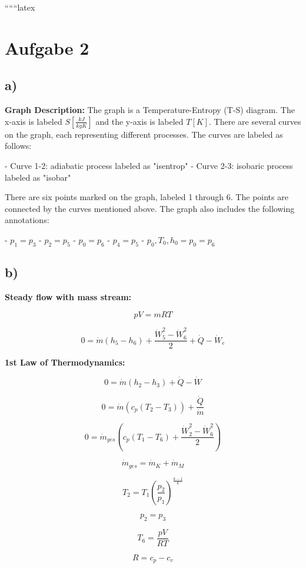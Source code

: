 
``````latex


\section*{Aufgabe 2}

\subsection*{a)}

\textbf{Graph Description:} The graph is a Temperature-Entropy (T-S) diagram. The x-axis is labeled $S \left[\frac{kJ}{kgK}\right]$ and the y-axis is labeled $T[K]$. There are several curves on the graph, each representing different processes. The curves are labeled as follows:

- Curve 1-2: adiabatic process labeled as "isentrop"
- Curve 2-3: isobaric process labeled as "isobar"

There are six points marked on the graph, labeled 1 through 6. The points are connected by the curves mentioned above. The graph also includes the following annotations:

- $p_1 = p_3$
- $p_2 = p_5$
- $p_0 = p_6$
- $p_4 = p_5$
- $p_0, T_0, h_0 = p_0 = p_6$

\subsection*{b)}

\textbf{Steady flow with mass stream:}

\[
pV = mRT
\]

\[
0 = \dot{m} \left( h_5 - h_6 \right) + \frac{\dot{W}_5^2 - \dot{W}_6^2}{2} + \dot{Q} - \dot{W}_e
\]

\textbf{1st Law of Thermodynamics:}

\[
0 = \dot{m} \left( h_2 - h_3 \right) + \dot{Q} - \dot{W}
\]

\[
0 = \dot{m} \left( c_p \left( T_2 - T_3 \right) \right) + \frac{\dot{Q}}{\dot{m}}
\]

\[
0 = \dot{m}_{ges} \left( c_p \left( T_1 - T_6 \right) + \frac{\dot{W}_2^2 - \dot{W}_6^2}{2} \right)
\]

\[
\dot{m}_{ges} = \dot{m}_K + \dot{m}_M
\]

\[
T_2 = T_1 \left( \frac{p_2}{p_1} \right)^{\frac{k-1}{k}}
\]

\[
p_2 = p_3
\]

\[
T_6 = \frac{pV}{RT}
\]

\[
R = c_p - c_v
\]

